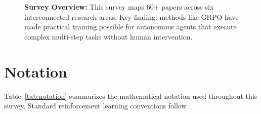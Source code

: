 \documentclass[12pt,a4paper]{report}
\theoremstyle{definition}
\begin{document}
\begin{figure}[htbp]
\caption*{\textbf{Survey Overview:} This survey maps 60+ papers across six interconnected research areas. Key finding: methods like GRPO have made practical training possible for autonomous agents that execute complex multi-step tasks without human intervention.
}
\end{figure}

\tableofcontents

\cleardoublepage{}
{}
\listoffigures

\cleardoublepage{}
{}
\listoftables

\chapter*{Notation}
\label{ch:notation}

\noindent Table~\ref{tab:notation} summarizes the mathematical notation used throughout this survey. Standard reinforcement learning conventions follow \cite{sutton2018reinforcement}.
\end{document}

